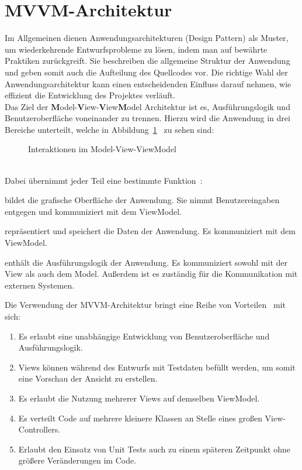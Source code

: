     \section{MVVM-Architektur}\label{sec:mvvm-architektur}
    Im Allgemeinen dienen Anwendungsarchitekturen (Design Pattern) als Muster, um wiederkehrende Entwurfsprobleme zu lösen, indem man auf bewährte Praktiken zurückgreift.
    Sie beschreiben die allgemeine Struktur der Anwendung und geben somit auch die Aufteilung des Quellcodes vor.
    Die richtige Wahl der Anwendungsarchitektur kann einen entscheidenden Einfluss darauf nehmen, wie effizient die Entwicklung des Projektes verläuft.\\
    Das Ziel der \textbf{M}odel-\textbf{V}iew-\textbf{V}iew\textbf{M}odel Architektur ist es, Ausführungslogik und Benutzeroberfläche voneinander zu trennen.
    Hierzu wird die Anwendung in drei Bereiche unterteilt, welche in Abbildung~\ref{fig:mvvm}~\cite{Sun2017/01} zu sehen sind:\\
    \begin{figure}[h]
        \centering
        
        \caption{Interaktionen im Model-View-ViewModel}
        \label{fig:mvvm}
    \end{figure}\\
    Dabei übernimmt jeder Teil eine bestimmte Funktion~\cite{Mishra2017}:
    \begin{description}[leftmargin=!,labelwidth=3cm]
        \item [View] bildet die grafische Oberfläche der Anwendung. Sie nimmt Benutzereingaben entgegen und kommuniziert mit dem ViewModel.
        \item [Model] repräsentiert und speichert die Daten der Anwendung. Es kommuniziert mit dem ViewModel.
        \item [ViewModel] enthält die Ausführungslogik der Anwendung. Es kommuniziert sowohl mit der View als auch dem Model. Außerdem ist es zuständig für die Kommunikation mit externen Systemen.
    \end{description}
    Die Verwendung der MVVM-Architektur bringt eine Reihe von Vorteilen~\cite{Anderson2012,Mishra2017} mit sich:
    \begin{enumerate}[label={(\arabic*)}]
        \item Es erlaubt eine unabhängige Entwicklung von Benutzeroberfläche und Ausführungslogik.
        \item Views können während des Entwurfs mit Testdaten befüllt werden, um somit eine Vorschau der Ansicht zu erstellen.
        \item Es erlaubt die Nutzung mehrerer Views auf demselben ViewModel.
        \item Es verteilt Code auf mehrere kleinere Klassen an Stelle eines großen View-Controllers.
        \item Erlaubt den Einsatz von Unit Tests auch zu einem späteren Zeitpunkt ohne größere Veränderungen im Code.
    \end{enumerate}

